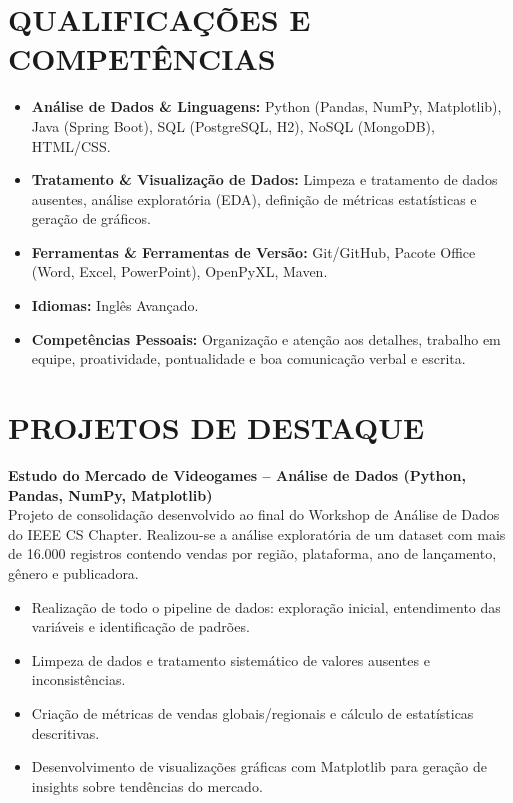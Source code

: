 \documentclass[a4paper,10pt]{article}
\begin{document}
\section{QUALIFICAÇÕES E COMPETÊNCIAS}
    \begin{itemize}
        \item \textbf{Análise de Dados \& Linguagens:} Python (Pandas, NumPy, Matplotlib), Java (Spring Boot), SQL (PostgreSQL, H2), NoSQL (MongoDB), HTML/CSS.
        \item \textbf{Tratamento \& Visualização de Dados:} Limpeza e tratamento de dados ausentes, análise exploratória (EDA), definição de métricas estatísticas e geração de gráficos.
        \item \textbf{Ferramentas \& Ferramentas de Versão:} Git/GitHub, Pacote Office (Word, Excel, PowerPoint), OpenPyXL, Maven.
        \item \textbf{Idiomas:} Inglês Avançado.
        \item \textbf{Competências Pessoais:} Organização e atenção aos detalhes, trabalho em equipe, proatividade, pontualidade e boa comunicação verbal e escrita.
    \end{itemize}

\section{PROJETOS DE DESTAQUE}

\textbf{Estudo do Mercado de Videogames -- Análise de Dados (Python, Pandas, NumPy, Matplotlib)} \\
Projeto de consolidação desenvolvido ao final do Workshop de Análise de Dados do IEEE CS Chapter. Realizou-se a análise exploratória de um dataset com mais de 16.000 registros contendo vendas por região, plataforma, ano de lançamento, gênero e publicadora.
\begin{itemize}
    \item Realização de todo o pipeline de dados: exploração inicial, entendimento das variáveis e identificação de padrões.
    \item Limpeza de dados e tratamento sistemático de valores ausentes e inconsistências.
    \item Criação de métricas de vendas globais/regionais e cálculo de estatísticas descritivas.
    \item Desenvolvimento de visualizações gráficas com Matplotlib para geração de insights sobre tendências do mercado.
\end{itemize}
\end{document}
